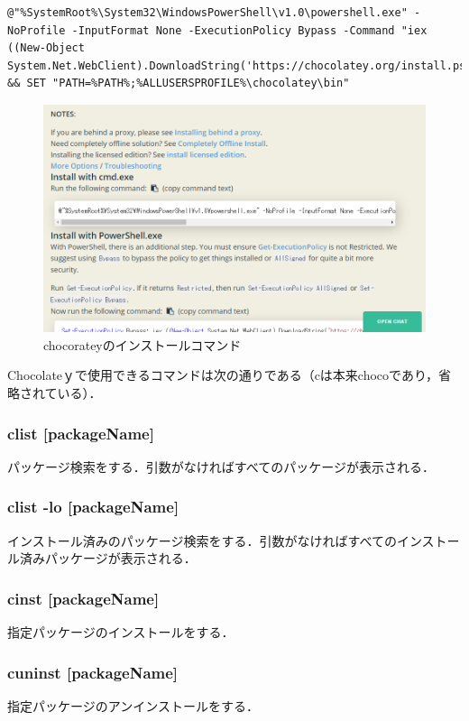 \begin{lstlisting}[breaklines = true, basicstyle=\ttfamily\footnotesize, frame=single]
@"%SystemRoot%\System32\WindowsPowerShell\v1.0\powershell.exe" -NoProfile -InputFormat None -ExecutionPolicy Bypass -Command "iex ((New-Object System.Net.WebClient).DownloadString('https://chocolatey.org/install.ps1'))" && SET "PATH=%PATH%;%ALLUSERSPROFILE%\chocolatey\bin"
\end{lstlisting}

\begin{figure}[htb]
\centering
\includegraphics[width=13cm]{img/choco2.png}
\caption{chocorateyのインストールコマンド}
\end{figure}

Chocolateｙで使用できるコマンドは次の通りである（cは本来chocoであり，省略されている）．
\subsubsection{clist [packageName]}
パッケージ検索をする．引数がなければすべてのパッケージが表示される．
\subsubsection{clist -lo [packageName]}
インストール済みのパッケージ検索をする．引数がなければすべてのインストール済みパッケージが表示される．
\subsubsection{cinst [packageName]}
指定パッケージのインストールをする．
\subsubsection{cuninst [packageName]}
指定パッケージのアンインストールをする．
